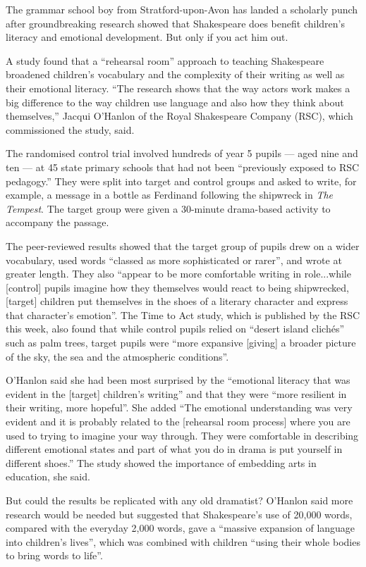 \documentclass[UTF8,11pt]{ctexart}
\begin{document}
The grammar school boy from Stratford-upon-Avon has landed a scholarly punch after groundbreaking research showed that Shakespeare does benefit children’s literacy and emotional development. But only if you act him out.


A study found that a “rehearsal room” approach to teaching Shakespeare broadened children’s vocabulary and the complexity of their writing as well as their emotional literacy. “The research shows that the way actors work makes a big difference to the way children use language and also how they think about themselves,” Jacqui O’Hanlon of the Royal Shakespeare Company (RSC), which commissioned the study, said.


The randomised control trial involved hundreds of year 5 pupils — aged nine and ten — at 45 state primary schools that had not been “previously exposed to RSC pedagogy.” They were split into target and control groups and asked to write, for example, a message in a bottle as Ferdinand following the shipwreck in \textit{The Tempest}. The target group were given a 30-minute drama-based activity to accompany the passage.


The peer-reviewed results showed that the target group of pupils drew on a wider vocabulary, used words “classed as more sophisticated or rarer”, and wrote at greater length. They also “appear to be more comfortable writing in role...while [control] pupils imagine how they themselves would react to being shipwrecked, [target] children put themselves in the shoes of a literary character and express that character’s emotion”. The Time to Act study, which is published by the RSC this week, also found that while control pupils relied on “desert island clichés” such as palm trees, target pupils were “more expansive [giving] a broader picture of the sky, the sea and the atmospheric conditions”.


O’Hanlon said she had been most surprised by the “emotional literacy that was evident in the [target] children’s writing” and that they were “more resilient in their writing, more hopeful”. She added “The emotional understanding was very evident and it is probably related to the [rehearsal room process] where you are used to trying to imagine your way through. They were comfortable in describing different emotional states and part of what you do in drama is put yourself in different shoes.” The study showed the importance of embedding arts in education, she said.


But could the results be replicated with any old dramatist? O’Hanlon said more research would be needed but suggested that Shakespeare’s use of 20,000 words, compared with the everyday 2,000 words, gave a “massive expansion of language into children’s lives”, which was combined with children “using their whole bodies to bring words to life”.
\end{document}
